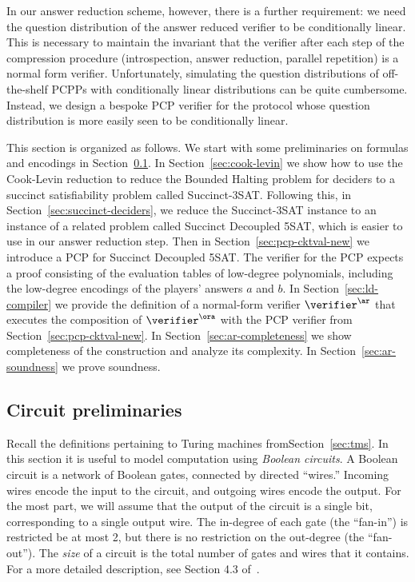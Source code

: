 In our answer reduction scheme, however, there is a further requirement: we need
the question distribution of the answer reduced verifier to be conditionally
linear.
This is necessary to maintain the invariant that the verifier after each step of
the compression procedure (introspection, answer reduction, parallel repetition)
is a normal form verifier.
Unfortunately, simulating the question distributions of off-the-shelf PCPPs with
conditionally linear distributions can be quite cumbersome.
Instead, we design a bespoke PCP verifier for the protocol whose question
distribution is more easily seen to be conditionally linear.

This section is organized as follows.
We start with some preliminaries on formulas and encodings in
Section~\ref{sec:ar-tms}.
In Section~\ref{sec:cook-levin} we show how to use the Cook-Levin reduction to
reduce the Bounded Halting problem for deciders to a succinct satisfiability
problem called Succinct-3SAT.
Following this, in Section~\ref{sec:succinct-deciders}, we reduce the
Succinct-3SAT instance to an instance of a related problem called Succinct
Decoupled 5SAT, which is easier to use in our answer reduction step.
Then in Section~\ref{sec:pcp-cktval-new} we introduce a PCP for Succinct
Decoupled 5SAT.
The verifier for the PCP expects a proof consisting of the evaluation tables of
low-degree polynomials, including the low-degree encodings of the players'
answers $a$ and $b$.
In Section~\ref{sec:ld-compiler} we provide the definition of a normal-form
verifier $\verifier^\ar$ that executes the composition of $\verifier^\ora$ with
the PCP verifier from Section~\ref{sec:pcp-cktval-new}.
In Section~\ref{sec:ar-completeness} we show completeness of the construction
and analyze its complexity.
In Section~\ref{sec:ar-soundness} we prove soundness.

\subsection{Circuit preliminaries}
\label{sec:ar-tms}

Recall the definitions pertaining to Turing machines fromSection~\ref{sec:tms}. In this section it is useful to model
computation using \emph{Boolean circuits}. A Boolean circuit is
a network of Boolean gates, connected by directed ``wires.'' Incoming
wires encode the input to the circuit, and outgoing wires encode the
output. For the most part, we will assume that the output of the
circuit is a single bit, corresponding to a single output wire. The
in-degree of each gate (the ``fan-in'')
is restricted be at most 2, but there is no restriction on
the out-degree (the ``fan-out''). The \emph{size} of a circuit is the total
number of gates and wires that it contains. For a more detailed description, see Section 4.3 of~\cite{Pap94}.

